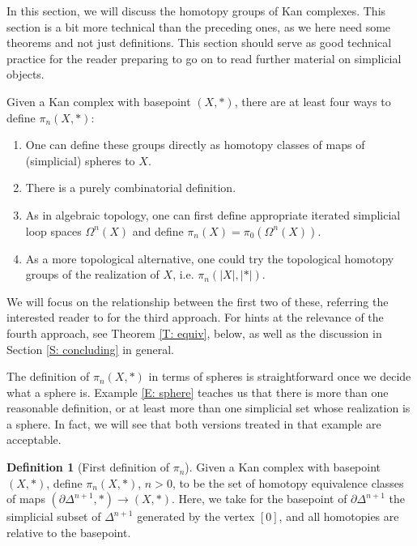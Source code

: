 \documentclass[12pt]{article}
\theoremstyle{plain}
\theoremstyle{definition}
\newtheorem{definition}[theorem]{Definition}
\theoremstyle{remark}
\newcommand{\bd}{\partial}
\begin{document}
In this section, we will discuss the homotopy groups of Kan complexes. This section is a bit more technical than the preceding ones, as we here need some theorems and not just definitions. This section should serve as good technical practice for the reader preparing to go on to read  further material on simplicial objects. 

Given a  Kan complex  with basepoint $(X,*)$, there are at least four ways to define $\pi_n(X,*)$:

\begin{enumerate} 

\item One can define these groups directly as homotopy classes of maps of (simplicial) spheres to $X$.

\item There is a purely combinatorial definition.


\item As in algebraic topology, one can first define appropriate iterated simplicial loop spaces $\Omega^n(X)$ and define $\pi_n(X)=\pi_0(\Omega^n(X))$. 

\item As a more topological alternative, one could try the topological homotopy groups of the realization of $X$, i.e. $\pi_n(|X|,|*|)$.
\end{enumerate}

We will focus on the relationship between the first two of these, referring the interested reader to \cite{MOORE} for the third approach. For hints at the relevance of the fourth approach, see Theorem \ref{T: equiv}, below, as well as the discussion in Section \ref{S: concluding} in general. 


The definition of $\pi_n(X,*)$ in terms of spheres is straightforward once we decide what a sphere is. Example \ref{E: sphere} teaches us that there is more than one reasonable definition, or at least more than one simplicial set whose realization is a sphere. In fact, we will see that both versions treated in that example are acceptable. 

\begin{definition}[First definition of $\pi_n$]\label{D: pin1}
Given a Kan complex  with basepoint $(X,*)$, define $\pi_n(X,*)$, $n>0$, to be the set of homotopy equivalence classes of maps $(\bd \Delta^{n+1},*)\to (X,*)$. Here, we take for the basepoint of $\bd \Delta^{n+1}$ the simplicial subset of $\Delta^{n+1}$ generated by the vertex $[0]$, and all homotopies are relative to the basepoint.
\end{definition}
\end{document}
